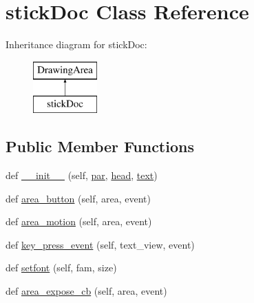 \hypertarget{classyellow_1_1stick_doc}{}\section{stick\+Doc Class Reference}
\label{classyellow_1_1stick_doc}
Inheritance diagram for stick\+Doc\+:\begin{figure}[H]
\begin{center}
\leavevmode
\includegraphics[height=2.000000cm]{classyellow_1_1stick_doc}
\end{center}
\end{figure}
\subsection*{Public Member Functions}
\begin{DoxyCompactItemize}
\item 
def \hyperlink{classyellow_1_1stick_doc_a6e4af27ccdc132f24f6e1cf523a4532b}{\+\_\+\+\_\+init\+\_\+\+\_\+} (self, \hyperlink{classyellow_1_1stick_doc_a8a4e5ec5926f293767f3c555868e4c21}{par}, \hyperlink{classyellow_1_1stick_doc_a434acd167ada209c34621739b6b8c583}{head}, \hyperlink{classyellow_1_1stick_doc_af575f17e6be3f269b86b041a60560dbf}{text})
\item 
def \hyperlink{classyellow_1_1stick_doc_a260d37924dae7e20867bbd197b9044ee}{area\+\_\+button} (self, area, event)
\item 
def \hyperlink{classyellow_1_1stick_doc_add4986c7f04102d45ce25c8e2510edf0}{area\+\_\+motion} (self, area, event)
\item 
def \hyperlink{classyellow_1_1stick_doc_aa33fa2b192b46f3d8e5e17d53a463f3c}{key\+\_\+press\+\_\+event} (self, text\+\_\+view, event)
\item 
def \hyperlink{classyellow_1_1stick_doc_a8f85a8233505e724112ad12098855c1d}{setfont} (self, fam, size)
\item 
def \hyperlink{classyellow_1_1stick_doc_a0730446d6038be2aa7f41b6a0262dfbe}{area\+\_\+expose\+\_\+cb} (self, area, event)
\end{DoxyCompactItemize}
